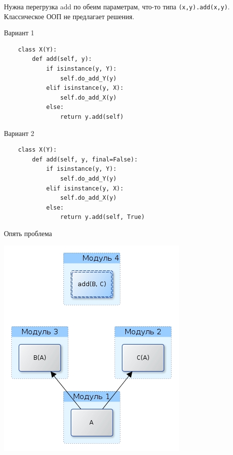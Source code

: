 \documentclass{article}
\begin{document}
    Нужна перегрузка add по обеим параметрам, что-то типа
    \lstinline!(x,y).add(x,y)!.  Классическое ООП не предлагает решения.
\newpage

\begin{center} Вариант 1 \end{center}
\begin{lstlisting}
    class X(Y):
        def add(self, y):
            if isinstance(y, Y):
                self.do_add_Y(y)
            elif isinstance(y, X):
                self.do_add_X(y)
            else:
                return y.add(self)
\end{lstlisting}
\newpage

\begin{center} Вариант 2 \end{center}
\begin{lstlisting}
    class X(Y):
        def add(self, y, final=False):
            if isinstance(y, Y):
                self.do_add_Y(y)
            elif isinstance(y, X):
                self.do_add_X(y)
            else:
                return y.add(self, True)
\end{lstlisting}
\newpage

\begin{center} Опять проблема \end{center}
    \begin{center} \includegraphics[scale=0.9]{images/virtual_problem.jpg} \end{center}
\newpage
\end{document}
